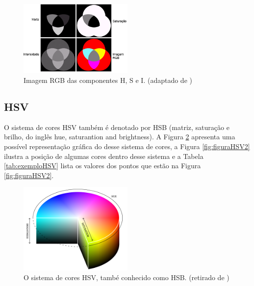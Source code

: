 \documentclass[	12pt, Times, openright, twoside, a4paper, english, brazil]{abntex2}
\begin{document}
\begin{figure}[!htb]
\centering \includegraphics[width=0.5\textwidth]{figuraComponentesHSI2.png}
\caption{Imagem RGB das componentes H, S e I. (adaptado de ) \label{fig:figuraComponentesHSI2}}
\end{figure}

\subsection{HSV}

O sistema de cores HSV também é denotado por HSB (matriz, saturação e brilho, do inglês hue, saturantion and brightness)\cite{burger2009digital}. A Figura \ref{fig:figuraHSV} apresenta uma possível representação gráfica do desse sistema de cores, a Figura \ref{fig:figuraHSV2} ilustra a posição de algumas cores dentro desse sistema e a Tabela \ref{tab:exemploHSV} lista os valores dos pontos que estão na Figura \ref{fig:figuraHSV2}.

\begin{figure}[!htb]
\centering \includegraphics[width=0.5\textwidth]{figuraHSV.png}
\caption{O sistema de cores HSV, també conhecido como HSB. (retirado de ) \label{fig:figuraHSV}}
\end{figure}
\end{document}
